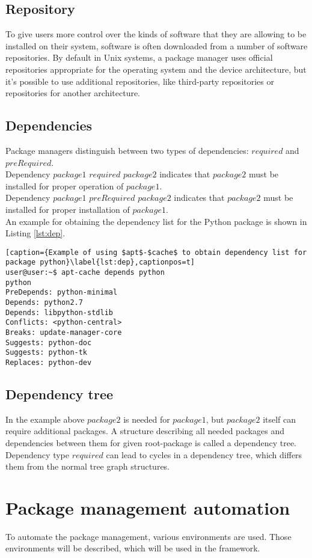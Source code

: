 \subsection*{Repository}
To give users more control over the kinds of software that they are allowing to be installed on their system, software is often downloaded from a number of software repositories.
By default in Unix systems, a package manager uses official repositories appropriate for the operating system and the device architecture, but it's possible to use additional repositories, like third-party repositories or repositories for another architecture.
\subsection*{Dependencies} \label{subs:dep}
Package managers distinguish between two types of dependencies: $required$ and $preRequired$.\\
Dependency $package1$ $required$ $package2$ indicates that $package2$ must be installed for proper operation of $package1$.\\
Dependency $package1$ $preRequired$ $package2$ indicates that $package2$ must be installed for proper installation of $package1$.\\
An example for obtaining the dependency list for the Python package is shown in Listing \ref{lst:dep}.
\begin{lstlisting}[caption={Example of using $apt$-$cache$ to obtain dependency list for package python}\label{lst:dep},captionpos=t] 
user@user:~$ apt-cache depends python
python
PreDepends: python-minimal
Depends: python2.7
Depends: libpython-stdlib
Conflicts: <python-central>
Breaks: update-manager-core
Suggests: python-doc
Suggests: python-tk
Replaces: python-dev
\end{lstlisting}
\subsection*{Dependency tree}
In the example above $package2$ is needed for $package1$, but $package2$ itself can require additional packages.
A structure describing all needed packages and dependencies between them for given root-package is called a dependency tree. 
Dependency type $required$ can lead to cycles in a dependency tree, which differs them from the normal tree graph structures.

\section{Package management automation}
To automate the package management, various environments are used. 
Those environments will be described, which will be used in the framework.
